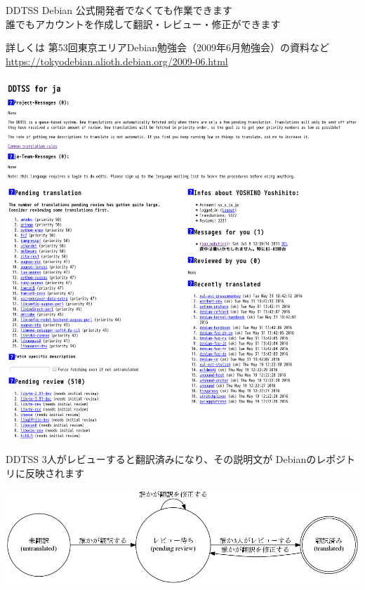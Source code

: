   \begin{frame}{DDTSS}
    Debian 公式開発者でなくても作業できます\\
    誰でもアカウントを作成して翻訳・レビュー・修正ができます

   詳しくは 第53回東京エリアDebian勉強会（2009年6月勉強会）の資料など\\
   \url{https://tokyodebian.alioth.debian.org/2009-06.html}

   \begin{center} 
  \includegraphics[width=0.9\hsize]{image201606/ddtss.png}
   \end{center}
 \end{frame}

 \begin{frame}{DDTSS}
  3人がレビューすると翻訳済みになり、その説明文が Debianのレポジトリに反映されます

  \begin{center} 
  \includegraphics[width=0.9\hsize]{image201606/ddtss-flow.png}
   \end{center}
 \end{frame}


